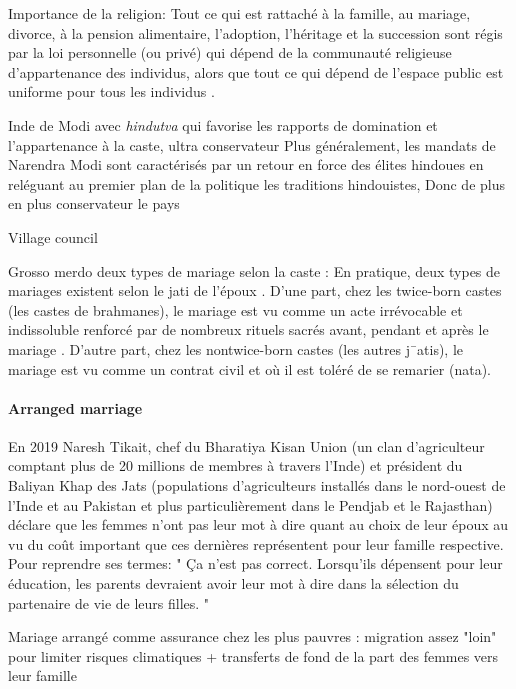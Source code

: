 \documentclass[a4paper, 11pt, onecolumn]{article}
\begin{document}
Importance de la religion:
Tout ce qui est rattaché à la famille, au mariage, divorce, à la pension alimentaire, l’adoption, l’héritage et la succession sont régis par la loi personnelle (ou privé) qui dépend de la communauté religieuse d’appartenance des individus, alors que tout ce qui dépend de l’espace public est uniforme pour tous les individus \citep{Moretti2004}.

Inde de Modi avec \textit{hindutva} qui favorise les rapports de domination et l'appartenance à la caste, ultra conservateur  \citep{Jaffrelot2018, DeVotta2002}
Plus généralement, les mandats de Narendra Modi
sont caractérisés par un retour en force des élites hindoues en reléguant au premier plan de la
politique les traditions hindouistes,
Donc de plus en plus conservateur le pays

Village council \citep{Blair2000, Alsop2000, Vijayalakshmi2003}

Grosso merdo deux types de mariage selon la caste :
En pratique, deux types de mariages existent selon le jati de l’époux \cite{Gupta1972}. D’une part,
chez les twice-born castes (les castes de brahmanes), le mariage est vu comme un acte irrévocable
et indissoluble renforcé par de nombreux rituels sacrés avant, pendant et après le mariage
\citep{Kapadia1966}. D’autre part, chez les nontwice-born castes (les autres j¯atis), le mariage est vu
comme un contrat civil et où il est toléré de se remarier (nata).

\paragraph{Arranged marriage}
En 2019 Naresh Tikait, chef du Bharatiya Kisan Union
(un clan d’agriculteur comptant plus de 20 millions de membres à travers l’Inde) et président
du Baliyan Khap des Jats (populations d’agriculteurs installés dans le nord-ouest de l’Inde et
au Pakistan et plus particulièrement dans le Pendjab et le Rajasthan) déclare que les femmes
n’ont pas leur mot à dire quant au choix de leur époux au vu du coût important que ces dernières
représentent pour leur famille respective. Pour reprendre ses termes: " Ça n’est pas correct.
Lorsqu’ils dépensent pour leur éducation, les parents devraient avoir leur mot à dire dans la
sélection du partenaire de vie de leurs filles. "


Mariage arrangé comme assurance chez les plus pauvres : migration assez "loin" pour limiter risques climatiques \cite{Rosenzweig1989} + transferts de fond de la part des femmes vers leur famille \cite{Belanger2011}
\end{document}
